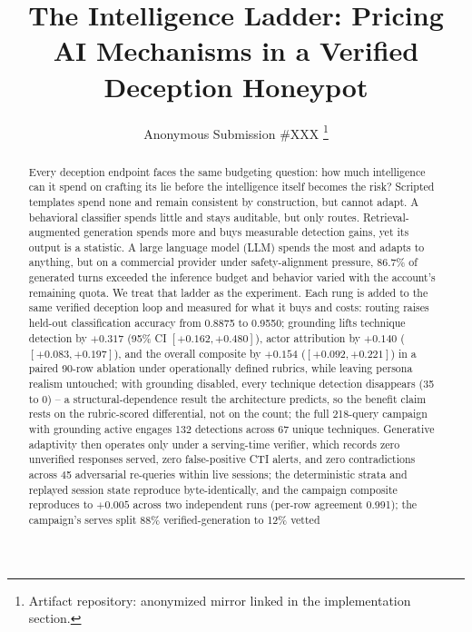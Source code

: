 \documentclass[conference,compsoc]{IEEEtran}
\begin{document}
\title{The Intelligence Ladder: Pricing AI Mechanisms in a Verified
Deception Honeypot}

\author{Anonymous Submission \#XXX%
\thanks{Artifact repository: anonymized mirror linked in the implementation section.}}

\maketitle

\begin{abstract}
Every deception endpoint faces the same budgeting question: how much
intelligence can it spend on crafting its lie before the intelligence
itself becomes the risk? Scripted templates spend none and remain
consistent by construction, but cannot adapt. A behavioral classifier spends little and
stays auditable, but only routes. Retrieval-augmented generation spends
more and buys measurable detection gains, yet its output is a statistic.
A large language model (LLM) spends the most and adapts to anything, but
on a commercial provider under safety-alignment pressure, 86.7\% of
generated turns exceeded the inference budget and behavior varied with
the account's remaining
quota. We treat that ladder as the experiment. Each rung is
added to the same verified deception loop and measured for what it buys
and costs: routing
raises held-out classification accuracy from 0.8875 to 0.9550; grounding
lifts technique detection by $+0.317$ (95\% CI $[+0.162,+0.480]$), actor
attribution by $+0.140$ ($[+0.083,+0.197]$), and the overall composite by
$+0.154$ ($[+0.092,+0.221]$) in a paired 90-row ablation under
operationally defined rubrics, while leaving persona realism untouched;
with grounding disabled, every technique detection disappears (35 to 0)
-- a structural-dependence result the architecture predicts, so the
benefit claim rests on the rubric-scored differential, not on the count;
the full 218-query campaign with grounding active engages 132 detections
across 67 unique techniques. Generative
adaptivity then operates only under a serving-time verifier, which
records zero unverified responses served, zero false-positive CTI
alerts, and zero contradictions across 45 adversarial re-queries within
live sessions; the deterministic strata and replayed session state
reproduce byte-identically, and the campaign composite reproduces to
$+0.005$ across two independent runs (per-row agreement 0.991); the
campaign's serves split 88\% verified-generation to 12\% vetted

\end{abstract}
\end{document}
